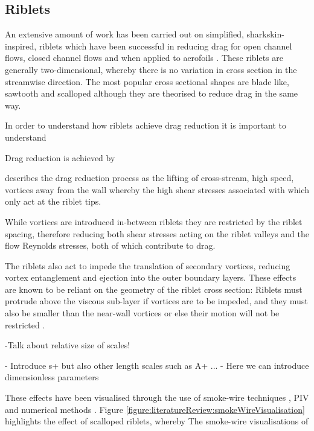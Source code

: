 \documentclass[12pt,oneside,a4paper]{article}
\begin{document}
\subsection{Riblets}
 An extensive amount of work has been carried out on simplified, sharkskin-inspired, riblets which have been successful in reducing drag for open channel flows, closed channel flows and when applied to aerofoils \citep{bixler2013review}. These riblets are generally two-dimensional, whereby there is no variation in cross section in the streamwise direction. The most popular cross sectional shapes are blade like, sawtooth and scalloped although they are theorised to reduce drag in the same way.

In order to understand how riblets achieve drag reduction it is important to understand 


Drag reduction is achieved by 

\cite{dean2010} describes the drag reduction process as the lifting of cross-stream, high speed, vortices away from the wall whereby the high shear stresses associated with which only act at the riblet tips.


While vortices are introduced in-between riblets they are restricted by the riblet spacing, therefore reducing both shear stresses acting on the riblet valleys and the flow Reynolds stresses, both of which contribute to drag.

The riblets also act to impede the translation of secondary vortices, reducing vortex entanglement and ejection into the outer boundary layers. These effects are known to be reliant on the geometry of the riblet cross section: Riblets must protrude above the viscous sub-layer if vortices are to be impeded, and they must also be smaller than the near-wall vortices or else their motion will not be restricted \citep{dean2010}. 
 
 -Talk about relative size of scales! 
 
 - Introduce s+ but also other length scales such as A+ ...
 - Here we can introduce dimensionless parameters
 
 
 
  These effects have been visualised through the use of smoke-wire techniques \citep{lee2001}, PIV \citep{lee2008} and numerical methods \citep{goldstein1995}. Figure \ref{figure:literatureReview:smokeWireVisualisation} highlights the effect of scalloped riblets, whereby 
  The smoke-wire visualisations of \cite{lee2001} 
  
\end{document}
